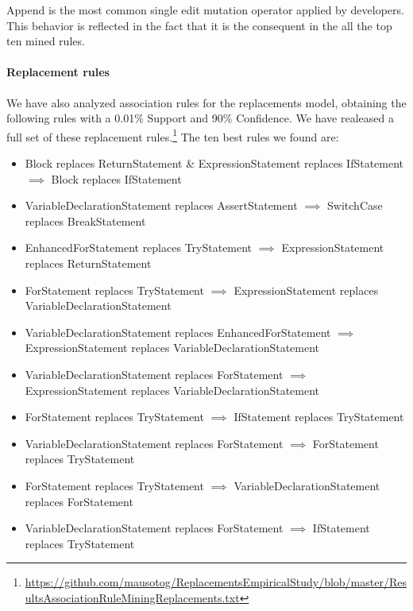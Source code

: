 \documentclass[conference]{IEEEtran}
\begin{document}
Append is the most common single edit mutation operator applied by developers. This behavior is
reflected in the fact that it is the consequent in the all the top ten mined
rules.  

\paragraph {Replacement rules} We have also analyzed association rules for the
replacements model, obtaining
the following rules with a 0.01\% Support and 90\% Confidence.
We have realeased a full set of these replacement rules.\footnote{\url{https://github.com/mausotog/ReplacementsEmpiricalStudy/blob/master/ResultsAssociationRuleMiningReplacements.txt}} The ten best rules we found are:
\begin{itemize}
\item Block replaces ReturnStatement \& ExpressionStatement replaces IfStatement $\implies$ Block replaces IfStatement
\item VariableDeclarationStatement replaces AssertStatement $\implies$ SwitchCase replaces BreakStatement
\item EnhancedForStatement replaces TryStatement $\implies$ ExpressionStatement replaces ReturnStatement
\item ForStatement replaces TryStatement $\implies$ ExpressionStatement replaces VariableDeclarationStatement
\item VariableDeclarationStatement replaces EnhancedForStatement $\implies$ ExpressionStatement replaces VariableDeclarationStatement
\item VariableDeclarationStatement replaces ForStatement $\implies$ ExpressionStatement replaces VariableDeclarationStatement
\item ForStatement replaces TryStatement $\implies$ IfStatement replaces TryStatement
\item VariableDeclarationStatement replaces ForStatement $\implies$ ForStatement replaces TryStatement
\item ForStatement replaces TryStatement $\implies$ VariableDeclarationStatement replaces ForStatement
\item VariableDeclarationStatement replaces ForStatement $\implies$ IfStatement replaces TryStatement
\end{itemize}

\end{document}
